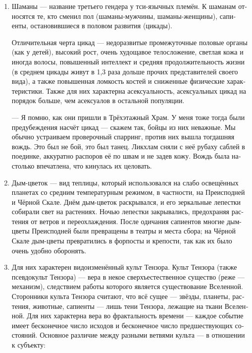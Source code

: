 \documentclass[a4paper,12pt,fleqn]{book}\usepackage{polyglossia}\setdefaultlanguage[babelshorthands=true]{russian}\setotherlanguage{english}\defaultfontfeatures{Ligatures=TeX,Mapping=tex-text}\usepackage{xcolor}\newcommand{\ml}[3]{#2}
\begin{document}
{\begin{enumerate}
\item Шаманы --- название третьего гендера у тси-язычных племён.
К шаманам относятся те, кто сменил пол (шаманы-мужчины, шаманы-женщины), сапиенты, остановившиеся в половом развития (цикады).

Отличительная черта цикад --- недоразвитые промежуточные половые органы (как у детей), высокий рост, очень худощавое телосложение, светлая кожа и иногда волосы, повышенный интеллект и средняя продолжительность жизни (в среднем цикады живут в 1,3 раза дольше прочих представителей своего вида), а также повышенная ломкость костей и сниженные физические характеристики.
Также для них характерна асексуальность, асексуальных цикад на порядок больше, чем асексуалов в остальной популяции.

--- Я помню, как они пришли в Трёхэтажный Храм.
У меня тоже тогда были предубеждения насчёт цикад --- скажем так, бойцы из них неважные.
Мы обычно устраиваем проверочный спарринг, против них вышла тогдашняя вождь.
Это был не бой, это был танец.
Ликхлам сняли с неё рубаху саблей в поединке, аккуратно распоров её по швам и не задев кожу.
Вождь была настолько впечатлена, что кинулась их целовать.

\item Дым-цветок --- вид теплицы, который использовался на слабо освещённых планетах со средним температурным режимом, в частности, на Преисподней и Чёрной Скале.
Днём дым-цветок раскрывался, и его зеркальные лепестки собирали свет на растениях.
Ночью лепестки закрывались, предохраняя растения от ветров и переохлаждения.
После одичания сапиентов многие дым-цветы Преисподней были превращены в театры и места сбора;
на Чёрной Скале дым-цветы превратились в форпосты и крепости, так как их было очень удобно оборонять.

\item Для них характерен видоизменённый культ Тензора.
Культ Тензора (также псевдокульт Тензора) --- вера в некое сверхъестественное существо (реже --- механизм), следствием работы которого является существование Вселенной.
Сторонники культа Тензора считают, что всё сущее --- звёзды, планеты, растения, животные, сапиенты --- лишь тени Тензора, лежащие на ткани Вселенной.
Для них характерна вера во фрактальность времени --- каждое событие имеет бесконечное число исходов и бесконечное число предшествующих состояний.
Основное различие между разными ветвями культа --- в отношении к субъекту:


\end{enumerate}}
\end{document}
